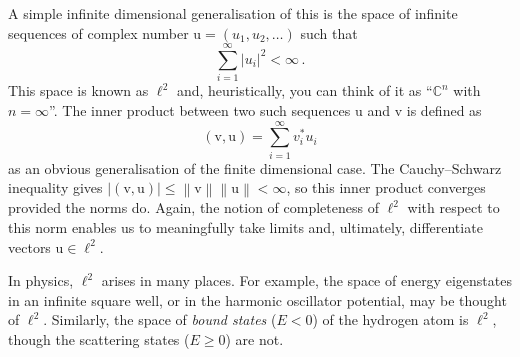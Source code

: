\documentclass{article}
\theoremstyle{plain}\theoremheaderfont{\normalfont\itshape}\theorembodyfont{\rmfamily}\theoremseparator{.}\newtheorem*{rem}{Remark}\newtheorem*{ex}{Example}\newtheorem*{proof}{Proof}\newtheorem*{altp}{Alternative proof}
\theoremstyle{plain}\theoremheaderfont{\normalfont\bfseries}\theorembodyfont{\rmfamily}\theoremseparator{.}\newtheorem{thm}{Theorem}[section]\newtheorem{lem}[thm]{Lemma}\newtheorem{prop}[thm]{Proposition}\newtheorem*{cor}{Corollary}\newtheorem{defn}[thm]{Definition}\newtheorem{clm}[thm]{Claim}\newtheorem{clminproof}{Claim}
\theoremstyle{break}\theoremheaderfont{\normalfont\itshape}\theorembodyfont{\rmfamily}\theoremseparator{.\medskip}\newtheorem*{proofskip}{Proof}\newtheorem*{exs}{Examples}\newtheorem*{rems}{Remarks}
\theoremstyle{break}\theoremheaderfont{\normalfont\bfseries}\theorembodyfont{\rmfamily}\theoremseparator{.\medskip}\newtheorem{lemskip}[thm]{Lemma}\newtheorem{defnskip}[thm]{Definition}\newtheorem{propskip}[thm]{Proposition}\newtheorem{thmskip}[thm]{Theorem}
\numberwithin{equation}{section}
\newcommand{\vb}[1]{\bm{\mathrm{#1}}}
\newcommand{\abs}[1]{\left| #1 \right|}
\newcommand{\norm}[1]{\left\| #1 \right\|}
\newcommand{\CC}{\mathbb{C}}
\begin{document}
    A simple infinite dimensional generalisation of this is the space of infinite sequences of complex number \(\vb{u}=(u_1,u_2,\dots)\) such that
    \begin{equation}
        \sum_{i=1}^{\infty}\abs{u_i}^2<\infty\,.
    \end{equation}
    This space is known as \(\ell^2\) and, heuristically, you can think of it as ``\(\CC^n\) with \(n=\infty\)''. The inner product between two such sequences \(\vb{u}\) and \(\vb{v}\) is defined as
    \begin{equation}
        (\vb{v},\vb{u})=\sum_{i=1}^{\infty}v_i^* u_i
    \end{equation}
    as an obvious generalisation of the finite dimensional case. The Cauchy--Schwarz inequality gives \(\abs{(\vb{v},\vb{u})}\le\norm{\vb{v}}\norm{\vb{u}}<\infty\), so this inner product converges provided the norms do. Again, the notion of completeness of \(\ell^2\) with respect to this norm enables us to meaningfully take limits and, ultimately, differentiate vectors \(\vb{u}\in \ell^2\).

    In physics, \(\ell^2\) arises in many places. For example, the space of energy eigenstates in an infinite square well, or in the harmonic oscillator potential, may be thought of \(\ell^2\). Similarly, the space of \textit{bound states} (\(E<0\)) of the hydrogen atom is \(\ell^2\), though the scattering states (\(E\ge 0\)) are not.
\end{document}
